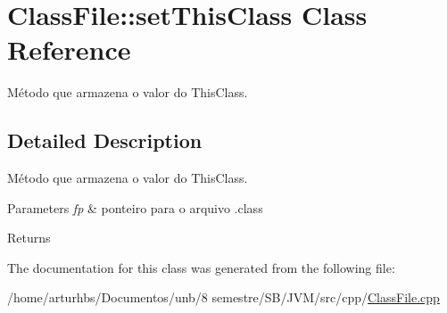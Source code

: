 \hypertarget{classClassFile_1_1setThisClass}{}\section{Class\+File\+:\+:set\+This\+Class Class Reference}
\label{classClassFile_1_1setThisClass}


Método que armazena o valor do This\+Class.  




\subsection{Detailed Description}
Método que armazena o valor do This\+Class. 


\begin{DoxyParams}{Parameters}
{\em fp} & ponteiro para o arquivo .class \\
\hline
\end{DoxyParams}
\begin{DoxyReturn}{Returns}

\end{DoxyReturn}


The documentation for this class was generated from the following file\+:\begin{DoxyCompactItemize}
\item 
/home/arturhbs/\+Documentos/unb/8 semestre/\+S\+B/\+J\+V\+M/src/cpp/\hyperlink{ClassFile_8cpp}{Class\+File.\+cpp}\end{DoxyCompactItemize}
